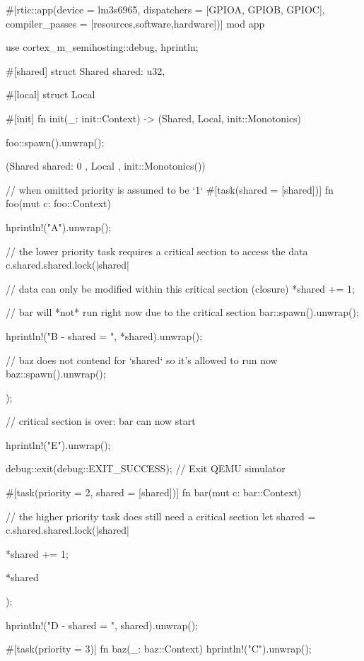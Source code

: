 #[rtic::app(device = lm3s6965, dispatchers = [GPIOA, GPIOB, GPIOC], compiler_passes = [resources,software,hardware])]
mod app {
    use cortex_m_semihosting::{debug, hprintln};

    #[shared]
    struct Shared {
        shared: u32,
    }

    #[local]
    struct Local {}

    #[init]
    fn init(_: init::Context) -> (Shared, Local, init::Monotonics) {
        foo::spawn().unwrap();

        (Shared { shared: 0 }, Local {}, init::Monotonics())
    }

    // when omitted priority is assumed to be `1`
    #[task(shared = [shared])]
    fn foo(mut c: foo::Context) {
        hprintln!("A").unwrap();

        // the lower priority task requires a critical section to access the data
        c.shared.shared.lock(|shared| {
            // data can only be modified within this critical section (closure)
            *shared += 1;

            // bar will *not* run right now due to the critical section
            bar::spawn().unwrap();

            hprintln!("B - shared = {}", *shared).unwrap();

            // baz does not contend for `shared` so it's allowed to run now
            baz::spawn().unwrap();
        });

        // critical section is over: bar can now start

        hprintln!("E").unwrap();

        debug::exit(debug::EXIT_SUCCESS); // Exit QEMU simulator
    }

    #[task(priority = 2, shared = [shared])]
    fn bar(mut c: bar::Context) {
        // the higher priority task does still need a critical section
        let shared = c.shared.shared.lock(|shared| {
            *shared += 1;

            *shared
        });

        hprintln!("D - shared = {}", shared).unwrap();
    }

    #[task(priority = 3)]
    fn baz(_: baz::Context) {
        hprintln!("C").unwrap();
    }
}
